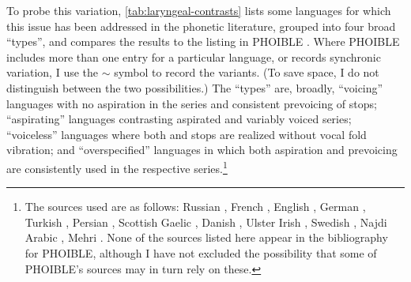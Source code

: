 \documentclass[output=paper,colorlinks,citecolor=brown]{langscibook}
\begin{document}
To probe this variation, \cref{tab:laryngeal-contrasts} lists some languages for which this issue has been addressed in the phonetic literature, grouped into four broad \enquote{types}, and compares the results to the listing in PHOIBLE \parencite{phoible}. Where PHOIBLE includes more than one entry for a particular language, or records synchronic variation, I use the $\sim$ symbol to record the variants. (To save space, I do not distinguish between the two possibilities.) The \enquote{types} are, broadly, \enquote{voicing} languages with no aspiration in the {\VOICELESS} series and consistent prevoicing of {\VOICED} stops; \enquote{aspirating} languages contrasting aspirated and variably voiced series; \enquote{voiceless} languages where both {\VOICELESS} and {\VOICED} stops are realized without vocal fold vibration; and \enquote{overspecified} languages in which both aspiration and prevoicing are consistently used in the respective series.\footnote{The sources used are as follows: Russian  \parencite{ringen2012voicing}, French  \parencite{abdelli-beruh2004stop}, English  \parencite{jansen07:_phonol_englis}, German  \parencite{jessen02:_laryn_german}, Turkish  \parencite{kallestinova04:_voice_turkis}, Persian  \parencite{bijankhan2009voice}, Scottish Gaelic  \parencite{Nance2019}, Danish  \parencite{hutters85:_vocal_danis, puggaard-rode2022danish}, Ulster Irish  \parencite{nichasaide1986preaspiration}, Swedish  \parencite{helgason08:_voicin_swedis}, Najdi Arabic  \parencite{al-gamdi2019najdi}, Mehri  \parencite{Watson2016}. None of the sources listed here appear in the bibliography for PHOIBLE, although I have not excluded the possibility that some of PHOIBLE's sources may in turn rely on these.}
\end{document}
